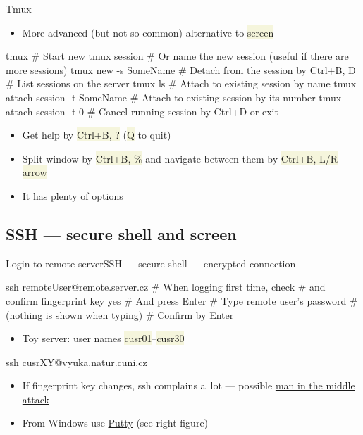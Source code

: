\documentclass[compress, xelatex, 11pt, xcolor=svgnames, aspectratio=169,
	hyperref={
		bookmarks=true,
		unicode=true,
		colorlinks=true,
		pdftitle={Linux, command line and MetaCentrum},
		plainpages=false,
		pdfauthor={Vojtech Zeisek},
		pdfsubject={Course about use of Linux command line, writing shell scripts and using MetaCentrum of CESNET},
		pdfcreator={XeLaTeX},
		pdfkeywords={Linux, GNU, BASH, shell, command line, MetaCentrum},
		linkcolor=DarkRed, %
		anchorcolor=DarkBlue, %
		citecolor=Indigo, %
		filecolor=NavyBlue, %
		menucolor=DarkMagenta, %
		urlcolor=DarkBlue, %
		},
	url={hyphens, lowtilde} %
	]{beamer}
\renewcommand{\texttt}[1]{\colorbox{Beige}{{\ttfamily #1}}}
\begin{document}
\begin{frame}[fragile]{Tmux}
	\begin{itemize}
		\item More advanced (but not so common) alternative to \texttt{screen}
	\end{itemize}
	\vfill
	\begin{bashcode}
    tmux # Start new tmux session
    # Or name the new session (useful if there are more sessions)
    tmux new -s SomeName
    # Detach from the session by Ctrl+B, D
    # List sessions on the server
    tmux ls
    # Attach to existing session by name
    tmux attach-session -t SomeName
    # Attach to existing session by its number
    tmux attach-session -t 0
    # Cancel running session by Ctrl+D or exit
	\end{bashcode}
	\vfill
	\begin{itemize}
		\item Get help by \texttt{Ctrl+B, ?} (\texttt{Q} to quit)
		\item Split window by \texttt{Ctrl+B, \%} and navigate between them by \texttt{Ctrl+B, L/R arrow}
		\item It has plenty of options
	\end{itemize}
\end{frame}

\subsection[SSH]{SSH --- secure shell and screen}

\begin{frame}[fragile]{Login to remote server}{SSH --- secure shell --- encrypted connection}
	\label{ssh}
	\begin{multicols}{2}
		\begin{bashcode}
    ssh remoteUser@remote.server.cz
    # When logging first time, check
    # and confirm fingerprint key
    yes # And press Enter
    # Type remote user's password
    # (nothing is shown when typing)
    # Confirm by Enter
		\end{bashcode}
		\vfill
		\begin{itemize}
			\item Toy server: user names \texttt{cusr01}--\texttt{cusr30}
		\end{itemize}
		\vfill
		\begin{bashcode}
    ssh cusrXY@vyuka.natur.cuni.cz
		\end{bashcode}
		\vfill
		\begin{itemize}
			\item If fingerprint key changes, ssh complains a~lot --- possible \href{https://en.wikipedia.org/wiki/Man-in-the-middle_attack}{man in the middle attack}
			\item From Windows use \href{https://www.putty.org/}{Putty} (see right figure)
		\end{itemize}
		\begin{center}
			\texttt{[image: putty.png]}
		\end{center}
	\end{multicols}
\end{frame}
\end{document}
